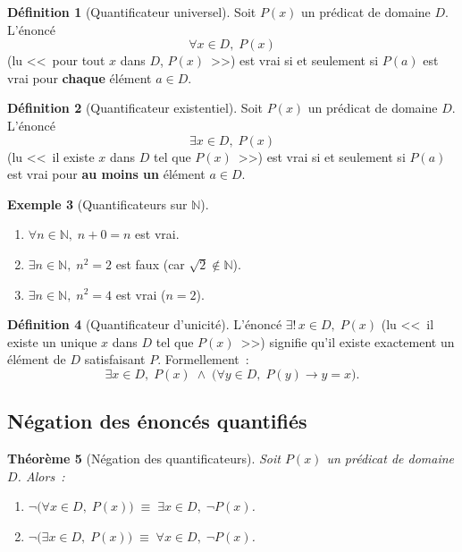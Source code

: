 \documentclass[12pt,a4paper,openany]{book}
\theoremstyle{definition}
\newtheorem{definition}{Définition}[chapter]
\newtheorem{exemple}[definition]{Exemple}
\theoremstyle{plain}
\newtheorem{theoreme}[definition]{Théorème}
\theoremstyle{remark}
\newcommand{\N}{\mathbb{N}}
\begin{document}
\begin{definition}[Quantificateur universel]\label{def:quant-universel}
  Soit $P(x)$ un pr\'edicat de domaine $D$. L'\'enonc\'e
  \[
    \forall x \in D, \; P(x)
  \]
  (lu <<~pour tout $x$ dans $D$, $P(x)$~>>) est vrai si et seulement si $P(a)$ est vrai pour \textbf{chaque} \'el\'ement $a \in D$.
\end{definition}

\begin{definition}[Quantificateur existentiel]\label{def:quant-existentiel}
  Soit $P(x)$ un pr\'edicat de domaine $D$. L'\'enonc\'e
  \[
    \exists x \in D, \; P(x)
  \]
  (lu <<~il existe $x$ dans $D$ tel que $P(x)$~>>) est vrai si et seulement si $P(a)$ est vrai pour \textbf{au moins un} \'el\'ement $a \in D$.
\end{definition}

\begin{exemple}[Quantificateurs sur $\N$]\label{ex:quantificateurs}
  \begin{enumerate}[label=(\alph*)]
    \item $\forall n \in \N, \; n + 0 = n$ est vrai.
    \item $\exists n \in \N, \; n^2 = 2$ est faux (car $\sqrt{2} \notin \N$).
    \item $\exists n \in \N, \; n^2 = 4$ est vrai ($n = 2$).
  \end{enumerate}
\end{exemple}

\begin{definition}[Quantificateur d'unicit\'e]\label{def:quant-unicite}
  L'\'enonc\'e $\exists! \, x \in D, \; P(x)$ (lu <<~il existe un unique $x$ dans $D$ tel que $P(x)$~>>) signifie qu'il existe exactement un \'el\'ement de $D$ satisfaisant $P$. Formellement~:
  \[
    \exists x \in D, \; P(x) \;\land\; \bigl(\forall y \in D, \; P(y) \to y = x\bigr).
  \]
\end{definition}

\subsection{N\'egation des \'enonc\'es quantifi\'es}
\label{subsec:negation-quantificateurs}

\begin{theoreme}[N\'egation des quantificateurs]\label{thm:neg-quantif}
  Soit $P(x)$ un pr\'edicat de domaine $D$. Alors~:
  \begin{enumerate}[label=(\roman*)]
    \item $\neg\bigl(\forall x \in D,\; P(x)\bigr) \;\equiv\; \exists x \in D, \; \neg P(x)$.
    \item $\neg\bigl(\exists x \in D,\; P(x)\bigr) \;\equiv\; \forall x \in D, \; \neg P(x)$.
  \end{enumerate}
\end{theoreme}
\end{document}
